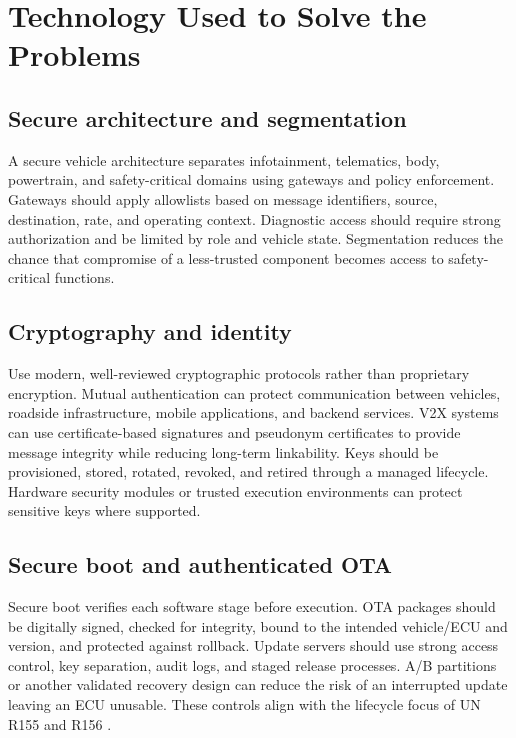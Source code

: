\documentclass[11pt]{article}
\begin{document}
\section{Technology Used to Solve the Problems}
\subsection{Secure architecture and segmentation}
A secure vehicle architecture separates infotainment, telematics, body, powertrain, and safety-critical domains using gateways and policy enforcement. Gateways should apply allowlists based on message identifiers, source, destination, rate, and operating context. Diagnostic access should require strong authorization and be limited by role and vehicle state. Segmentation reduces the chance that compromise of a less-trusted component becomes access to safety-critical functions.

\subsection{Cryptography and identity}
Use modern, well-reviewed cryptographic protocols rather than proprietary encryption. Mutual authentication can protect communication between vehicles, roadside infrastructure, mobile applications, and backend services. V2X systems can use certificate-based signatures and pseudonym certificates to provide message integrity while reducing long-term linkability. Keys should be provisioned, stored, rotated, revoked, and retired through a managed lifecycle. Hardware security modules or trusted execution environments can protect sensitive keys where supported.

\subsection{Secure boot and authenticated OTA}
Secure boot verifies each software stage before execution. OTA packages should be digitally signed, checked for integrity, bound to the intended vehicle/ECU and version, and protected against rollback. Update servers should use strong access control, key separation, audit logs, and staged release processes. A/B partitions or another validated recovery design can reduce the risk of an interrupted update leaving an ECU unusable. These controls align with the lifecycle focus of UN R155 and R156 \cite{unece155,unece156}.
\end{document}
